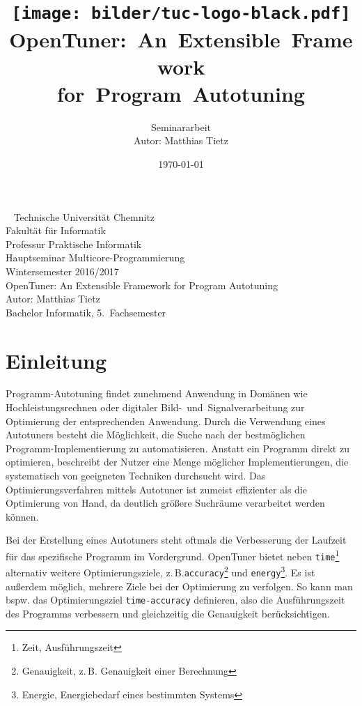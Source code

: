 \documentclass[a4paper,11pt]{scrartcl}
\title{\texttt{[image: bilder/tuc-logo-black.pdf]}
    OpenTuner:~An~Extensible~Framework\\for~Program~Autotuning
}
\author{Seminararbeit\\Autor: Matthias Tietz}
\date{\today}
\newcommand{\zB}{\mbox{z.\,B.}\xspace}
\begin{document}
\maketitle \thispagestyle{empty} \newpage

\thispagestyle{empty}
~
\vfill
\noindent %
Technische Universität Chemnitz\\
Fakultät für Informatik\\
Professur Praktische Informatik\\
Hauptseminar Multicore-Programmierung\\
Wintersemester 2016/2017\\

\noindent
OpenTuner: An Extensible Framework for Program Autotuning\\
Autor: Matthias Tietz\\
Bachelor Informatik, 5.~Fachsemester

\newpage
\tableofcontents \newpage



\section{Einleitung}

Programm-Autotuning findet zunehmend Anwendung in Domänen wie Hochleistungsrechnen oder
digitaler Bild-~und~Signalverarbeitung zur Optimierung der entsprechenden Anwendung.
Durch die Verwendung eines Autotuners besteht die Möglichkeit, die Suche nach der
bestmöglichen Programm-Implementierung zu automatisieren. Anstatt ein Programm direkt
zu optimieren, beschreibt der Nutzer eine Menge möglicher Implementierungen, die 
systematisch von geeigneten Techniken durchsucht wird. Das Optimierungsverfahren
mittels Autotuner ist zumeist effizienter als die Optimierung von Hand, da deutlich größere
Suchräume verarbeitet werden können. \newline

\noindent
Bei der Erstellung eines Autotuners steht oftmals die Verbesserung der Laufzeit
für das spezifische Programm im Vordergrund. OpenTuner bietet neben \texttt{time}\footnote{Zeit, Ausführungszeit}  
alternativ weitere Optimierungsziele, \zB \texttt{accuracy}\footnote{Genauigkeit, \zB Genauigkeit einer Berechnung}  
und \texttt{energy}\footnote{Energie, Energiebedarf eines bestimmten Systems}.
Es ist außerdem möglich, mehrere Ziele bei der Optimierung zu verfolgen. 
So kann man bspw. das Optimierungsziel \texttt{time-accuracy} definieren, also die Ausführungszeit
des Programms verbessern und gleichzeitig die Genauigkeit berücksichtigen.
\end{document}
